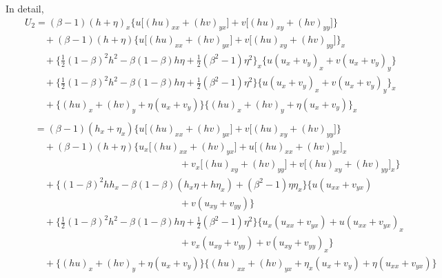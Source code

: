 \documentclass[11pt]{article}
\begin{document}
\newpage
In detail, 
\begin{eqnarray}
&&U_2=  (\beta-1)(h+\eta)_x \bigg\{
        u \Big[ (hu)_{xx} + (hv)_{yx} \Big] +  v \Big[ (hu)_{xy} + (hv)_{yy} \Big] \bigg\} 
        \nonumber \\
&& \quad \quad
        + (\beta-1)(h+\eta) \bigg\{
        u \Big[ (hu)_{xx} + (hv)_{yx} \Big] +  v \Big[ (hu)_{xy} + (hv)_{yy} \Big] \bigg\}_x
        \nonumber \\        
&& \quad \quad
        +\bigg\{ \frac{1}{2} (1-\beta)^2 h^2 - \beta (1-\beta) h \eta + \frac{1}{2} (\beta^2-1) \eta^2 \bigg\}_x
        \Big\{ u (u_x+v_y)_x + v(u_x+v_y)_y \Big\}   \nonumber  \\
&& \quad \quad
        +\bigg\{ \frac{1}{2} (1-\beta)^2 h^2 - \beta (1-\beta) h \eta + \frac{1}{2} (\beta^2-1) \eta^2 \bigg\}
        \Big\{ u (u_x+v_y)_x + v(u_x+v_y)_y \Big\}_x   \nonumber  \\
&& \quad \quad
        +\Big\{
        (hu)_x + (hv)_y + \eta (u_x+v_y) \Big\}
        \Big\{
        (hu)_x + (hv)_y + \eta (u_x+v_y) \Big\}_x
        \nonumber  \\
        \nonumber  \\
&& \quad 
     = (\beta-1)(h_x + \eta_x) \bigg\{
        u \Big[ (hu)_{xx} + (hv)_{yx} \Big] +  v \Big[ (hu)_{xy} + (hv)_{yy} \Big] \bigg\}
        \nonumber \\
&& \quad \quad
        + (\beta-1)(h+\eta) \bigg\{
            u_x \Big[ (hu)_{xx} + (hv)_{yx} \Big]
          + u \Big[ (hu)_{xx} + (hv)_{yx} \Big]_x
        \nonumber \\
&& \quad \quad \quad \quad \quad \quad \quad \quad 
   \quad \quad \quad \quad \quad \quad \quad \quad 
          + v_x \Big[ (hu)_{xy} + (hv)_{yy} \Big]
          + v \Big[ (hu)_{xy} + (hv)_{yy} \Big]_x
                            \bigg\}
        \nonumber \\
&& \quad \quad
       +\bigg\{ 
       (1-\beta)^2 h h_x - \beta (1-\beta) (h_x \eta + h \eta_x) + (\beta^2-1) \eta \eta_x
        \bigg\} 
        \bigg\{ u ( u_{xx} + v_{yx} ) 
        \nonumber \\
&& \quad \quad \quad \quad \quad \quad \quad \quad 
   \quad \quad \quad \quad \quad \quad \quad \quad
        + v ( u_{xy} + v_{yy} ) \bigg\}
        \nonumber \\
&& \quad \quad
        +\bigg\{ \frac{1}{2} (1-\beta)^2 h^2 - \beta (1-\beta) h \eta + \frac{1}{2} (\beta^2-1) \eta^2 \bigg\}
        \bigg\{ u_x ( u_{xx} + v_{yx} ) + u ( u_{xx} + v_{yx} )_x
        \nonumber \\
&& \quad \quad \quad \quad \quad \quad \quad \quad
   \quad \quad \quad \quad \quad \quad \quad \quad
        + v_x ( u_{xy} + v_{yy} ) + v ( u_{xy} + v_{yy} )_x
        \bigg\}
        \nonumber \\
&& \quad \quad        
        +\Big\{
        (hu)_x + (hv)_y + \eta (u_x+v_y) \Big\}
        \Big\{
        (hu)_{xx} + (hv)_{yx} + \eta_x (u_x+v_y) + \eta (u_{xx}+v_{yx}) \Big\}
        \nonumber \\
\end{eqnarray}
\end{document}
